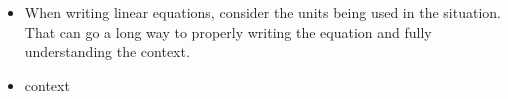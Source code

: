 \documentclass{ximera}
\begin{document}

\begin{summary}\begin{itemize}
\item When writing linear equations, consider the units being used in the situation. That can go a long way to properly writing the equation and fully understanding the context.
\item context
\end{itemize}\end{summary}


%
%
%
%
%
%
%
\end{document}
